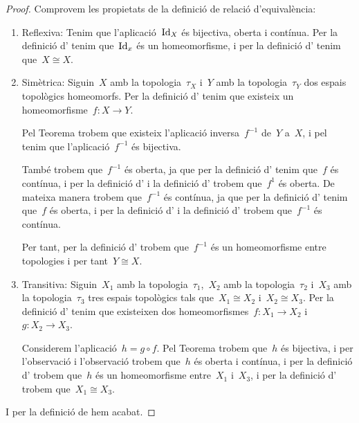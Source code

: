 \documentclass[../topologia.tex]{subfiles}
\begin{document}
    \begin{proof}
        Comprovem les propietats de la definició de relació d'equivalència:
        \begin{enumerate}
            \item Reflexiva: Tenim que l'aplicació~\(\operatorname{Id}_{X}\) és bijectiva, oberta i contínua.
            Per la definició d' tenim que~\(\operatorname{Id}_{x}\) és un homeomorfisme, i per la definició d' tenim que~\(X\cong X\).
            \item Simètrica: Siguin~\(X\) amb la topologia~\(\tau_{X}\) i~\(Y\) amb la topologia~\(\tau_{Y}\) dos espais topològics homeomorfs.
            Per la definició d' tenim que existeix un homeomorfisme~\(f\colon X\longrightarrow Y\).

            Pel Teorema  trobem que existeix l'aplicació inversa~\(f^{-1}\) de~\(Y\) a~\(X\), i pel \corollari{}  tenim que l'aplicació~\(f^{-1}\) és bijectiva.

            També trobem que~\(f^{-1}\) és oberta, ja que per la definició d' tenim que~\(f\) és contínua, i per la definició d' i la definició d' trobem que~\(f^{1}\) és oberta.
            De mateixa manera trobem que~\(f^{-1}\) és contínua, ja que per la definició d' tenim que~\(f\) és oberta, i per la definició d' i la definició d' trobem que~\(f^{-1}\) és contínua.

            Per tant, per la definició d' trobem que~\(f^{-1}\) és un homeomorfisme entre topologies i per tant~\(Y\cong X\).
            \item Transitiva: Siguin~\(X_{1}\) amb la topologia~\(\tau_{1}\),~\(X_{2}\) amb la topologia~\(\tau_{2}\) i~\(X_{3}\) amb la topologia~\(\tau_{3}\) tres espais topològics tals que~\(X_{1}\cong X_{2}\) i~\(X_{2}\cong X_{3}\).
            Per la definició d' tenim que existeixen dos homeomorfismes~\(f\colon X_{1}\longrightarrow X_{2}\) i~\(g\colon X_{2}\longrightarrow X_{3}\).

            Considerem l'aplicació~\(h=g\circ f\).
            Pel Teorema  trobem que~\(h\) és bijectiva, i per l'observació  i l'observació  trobem que~\(h\) és oberta i contínua, i per la definició d' trobem que~\(h\) és un homeomorfisme entre~\(X_{1}\) i~\(X_{3}\), i per la definició d' trobem que~\(X_{1}\cong X_{3}\).
        \end{enumerate}
        I per la definició de  hem acabat.
    \end{proof}
\end{document}
